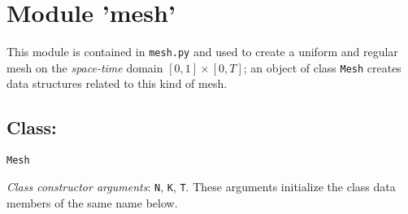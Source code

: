 \documentclass{amsart}
\theoremstyle{plain}
\theoremstyle{definition}
\theoremstyle{remark}
\numberwithin{equation}{section}
\begin{document}
\section{Module 'mesh'}
This module is contained in \verb|mesh.py| and used to create a uniform and regular mesh on the \textit{space-time} domain $[0,1]\times[0,T]$; an object of class \verb|Mesh| creates data structures related to this kind of mesh.

\subsection{Class:} \verb|Mesh|

\textit{Class constructor arguments}: \verb|N|, \verb|K|, \verb|T|. These arguments initialize the class data members of the same name below.
\end{document}
